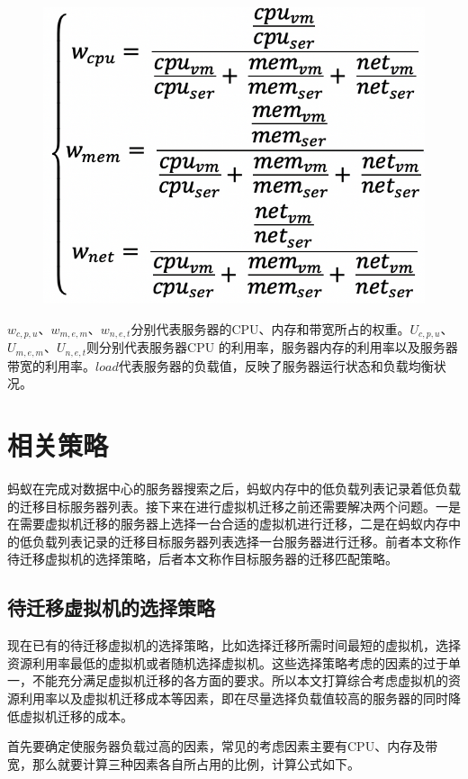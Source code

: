  \begin{figure}[ht]
  \centering
  \includegraphics[width=0.8\linewidth]{./Figure/IMG_Chap3_8.png}
\end{figure}

$ w_{c,p,u} $、$ w_{m,e,m} $、$ w_{n,e,t} $分别代表服务器的CPU、内存和带宽所占的权重。$ U_{c,p,u} $、$ U_{m,e,m} $、$ U_{n,e,t} $则分别代表服务器CPU 的利用率，服务器内存的利用率以及服务器带宽的利用率。$ load $代表服务器的负载值，反映了服务器运行状态和负载均衡状况。

\section{相关策略}
蚂蚁在完成对数据中心的服务器搜索之后，蚂蚁内存中的低负载列表记录着低负载的迁移目标服务器列表。接下来在进行虚拟机迁移之前还需要解决两个问题。一是在需要虚拟机迁移的服务器上选择一台合适的虚拟机进行迁移，二是在蚂蚁内存中的低负载列表记录的迁移目标服务器列表选择一台服务器进行迁移。前者本文称作待迁移虚拟机的选择策略，后者本文称作目标服务器的迁移匹配策略。

\subsection{待迁移虚拟机的选择策略}
现在已有的待迁移虚拟机的选择策略，比如选择迁移所需时间最短的虚拟机，选择资源利用率最低的虚拟机或者随机选择虚拟机。这些选择策略考虑的因素的过于单一，不能充分满足虚拟机迁移的各方面的要求。所以本文打算综合考虑虚拟机的资源利用率以及虚拟机迁移成本等因素，即在尽量选择负载值较高的服务器的同时降低虚拟机迁移的成本。

首先要确定使服务器负载过高的因素，常见的考虑因素主要有CPU、内存及带宽，那么就要计算三种因素各自所占用的比例，计算公式如下。

